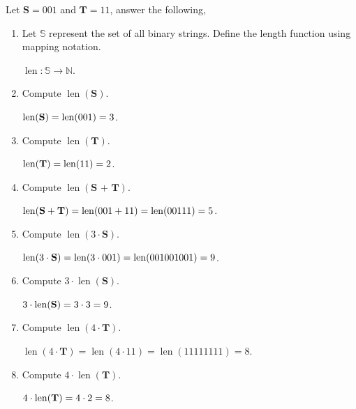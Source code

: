 \documentclass[12pt]{article} %
\begin{document}
\begin{qstn}
Let $\textbf{S} = 001$ and $\textbf{T} = 11$, answer the following,
  \begin{enumerate}[label=(\alph*)]
    \item Let $\mathbb S$ represent the set of all binary strings. Define the length function using mapping
      notation. \vspace*{-0.5cm}
      \begin{solution}
        $\operatorname{len} \colon \mathbb S \rightarrow \mathbb N$.
      \end{solution}
    \item Compute $ \operatorname{len}(\textbf{S})$.
      \begin{solution}
         $ \operatorname{len}(\vb S) = \operatorname{len}(001) = 3$.
      \end{solution}
    \item Compute $ \operatorname{len}(\textbf{T})$.
      \begin{solution}
         $ \operatorname{len}(\vb T) = \operatorname{len}(11) = 2$.
      \end{solution}
    \item Compute $ \operatorname{len}(\textbf{S + T})$.
      \begin{solution}
        $ \operatorname{len}(\vb S + \vb T) = \operatorname{len}(001 + 11) = \operatorname{len}(00111) = 5$.
      \end{solution}
    \item Compute $ \operatorname{len}(3\cdot\textbf{S})$.
      \begin{solution}
      $ \operatorname{len}(3\cdot \vb S) = \operatorname{len}(3 \cdot 001) = \operatorname{len}(001001001) = 9$.
      \end{solution}
    \item Compute $ 3\cdot \operatorname{len}(\textbf{S})$.
      \begin{solution}
        $3 \cdot \operatorname{len}(\vb S) = 3 \cdot 3 = 9$.
      \end{solution}
    \item Compute $ \operatorname{len}(4\cdot\textbf{T})$.
      \begin{solution}
        $\operatorname{len}(4\cdot\textbf{T}) = \operatorname{len}(4 \cdot 11) = \operatorname{len}(11111111) = 8$.
      \end{solution}
    \item Compute $ 4\cdot \operatorname{len}(\textbf{T})$.
      \begin{solution}
        $4 \cdot  \operatorname{len}(\vb T) = 4 \cdot 2 = 8$.
      \end{solution}
  \end{enumerate}
\end{qstn}
\end{document}
